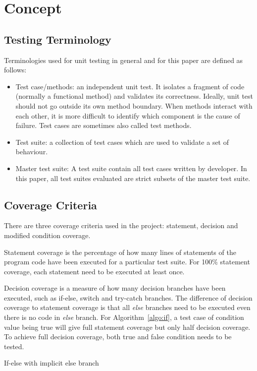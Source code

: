 \section{Concept}
\subsection{Testing Terminology}
Terminologies used for unit testing in general and for this paper are defined as follows:
\begin{itemize}
	\item Test case/methods: an independent unit test. It isolates a fragment of code (normally a functional method) and validates its correctness. Ideally, unit test should not go outside its own method boundary. When methods interact with each other, it is more difficult to identify which component is the cause of failure. Test cases are sometimes also called test methods.
	\item Test suite: a collection of test cases which are used to validate a set of behaviour.
	\item Master test suite: A test suite contain all test cases written by developer. In this paper, all test suites evaluated are strict subsets of the master test suite.
\end{itemize}

\subsection{Coverage Criteria}
There are three coverage criteria used in the project: statement, decision and modified condition coverage.

Statement coverage is the percentage of how many lines of statements of the program code have been executed for a particular test suite. For 100\% statement coverage, each statement need to be executed at least once.

Decision coverage is a measure of how many decision branches have been executed, such as if-else, switch and try-catch branches. The difference of decision coverage to statement coverage is that all \textit{else} branches need to be executed even there is no code in \textit{else} branch.  For Algorithm~\ref{algo:if}, a test case of condition value being true will give full statement coverage but only half decision coverage. To achieve full decision coverage, both true and false condition needs to be tested.

\begin{algorithm}[H]
	{
	}
	\caption{If-else with implicit else branch}
	\label{algo:if}
	\bigskip
\end{algorithm}

